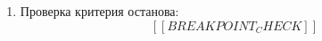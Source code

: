 \begin{enumerate}
\begin{figure}[H]
  \caption{Итерация №[[K]] метода наискорейшего спуска.}
  \end{figure}

  \item Проверка критерия останова:
  \[
    [[BREAKPOINT_CHECK]]
  \]
\end{enumerate}
